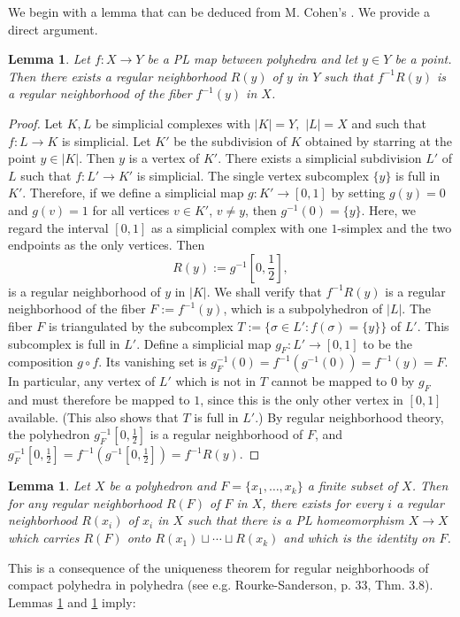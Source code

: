 \documentclass{amsart}
\newtheorem{lemma}[thm]{Lemma}
\theoremstyle{definition}
\theoremstyle{remark}
\newcommand {\smlhf} {\ensuremath{\mbox{$\frac{1}{2}$}}}
\begin{document}
We begin with a lemma that can be deduced from 
M. Cohen's \cite[p. 194, Lemma 2.14]{cohenmarshallgenregnbhds}.
We provide a direct argument.
\begin{lemma} \label{sublemma1}
Let $f: X\to Y$ be a PL map between polyhedra and let $y\in Y$ be a point.
Then there exists a regular neighborhood $R(y)$ of $y$ in $Y$
such that
$f^{-1} R(y)$ is a regular neighborhood of the fiber $f^{-1} (y)$ in $X$.
\end{lemma}
\begin{proof}
Let $K,L$ be simplicial complexes with $|K|=Y,$ $|L|=X$ and
such that $f:L\to K$ is simplicial.
Let $K'$ be the subdivision of $K$ obtained by starring
at the point $y \in |K|$. Then $y$ is a vertex of $K'$.
There exists a simplicial subdivision $L'$ of $L$ such that
$f: L' \to K'$ is simplicial.
The single vertex subcomplex $\{ y \}$ is full in $K'$.
Therefore, if we define a simplicial map
$g: K' \to [0,1]$
by setting $g(y) =0$ and $g(v)=1$ for all vertices $v\in K'$, $v\not= y$,
then
$g^{-1} (0) = \{ y \}.$
Here, we regard the interval $[0,1]$ as a simplicial complex
with one $1$-simplex and the two endpoints as the only vertices.
Then
\[ R(y) := g^{-1} [0,\smlhf], \]
is a regular neighborhood of $y$ in $|K|$.
We shall verify that $f^{-1} R(y)$ is a regular neighborhood of
the fiber $F := f^{-1} (y)$, which is a subpolyhedron of $|L|$.
The fiber $F$ is triangulated by the subcomplex
$T := \{ \sigma \in L' : f(\sigma) = \{ y \} \}$ of $L'$.
This subcomplex is full in $L'$.
Define a simplicial map $g_F: L' \to [0,1]$ to be the composition $g \circ f$.
Its vanishing set is
$g_F^{-1} (0) = f^{-1} (g^{-1} (0)) = f^{-1} (y) =F.$
In particular, any vertex of $L'$ which is not in $T$ cannot be
mapped to $0$ by $g_F$ and must therefore be mapped to $1$, since
this is the only other vertex in $[0,1]$ available.
(This also shows that $T$ is full in $L'$.)
By regular neighborhood theory, the polyhedron
$g_F^{-1} [0,\smlhf]$ is a regular neighborhood of $F$, and
$g_F^{-1} [0,\smlhf] = f^{-1} (g^{-1} [0,\smlhf]) 
    = f^{-1} R(y).$
\end{proof}

\begin{lemma} \label{sublemma2}
Let $X$ be a polyhedron and $F = \{ x_1, \ldots, x_k \}$ 
a finite subset of $X$.
Then for any regular neighborhood $R(F)$ of $F$ in $X$,
there exists for every $i$ a regular neighborhood $R(x_i)$ of $x_i$ in $X$
such that there is a PL homeomorphism $X \to X$ which carries
$R(F)$ onto  $R(x_1) \sqcup \cdots \sqcup R(x_k)$ 
and which is the identity on $F$.
\end{lemma}
This is a consequence of the uniqueness theorem for 
regular neighborhoods of compact polyhedra in polyhedra
(see e.g. Rourke-Sanderson, p. 33, Thm. 3.8).
Lemmas \ref{sublemma1} and \ref{sublemma2} imply:
\end{document}
